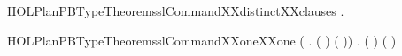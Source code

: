 \newcommand{\HOLPlanPBTypeTheoremspsgCommandXXdistinctXXclauses}{\UseVerbatim{HOLPlanPBTypeTheoremspsgCommandXXdistinctXXclauses}}
\begin{SaveVerbatim}{HOLPlanPBTypeTheoremsslCommandXXdistinctXXclauses}
\HOLTokenTurnstile{} \HOLSymConst{\HOLTokenForall{}} .   \HOLSymConst{\HOLTokenNotEqual{}}  
\end{SaveVerbatim}
\newcommand{\HOLPlanPBTypeTheoremsslCommandXXdistinctXXclauses}{\UseVerbatim{HOLPlanPBTypeTheoremsslCommandXXdistinctXXclauses}}
\begin{SaveVerbatim}{HOLPlanPBTypeTheoremsslCommandXXoneXXone}
\HOLTokenTurnstile{} (\HOLSymConst{\HOLTokenForall{}} . (  \HOLSymConst{=}  ) \HOLSymConst{\HOLTokenEquiv{}} ( \HOLSymConst{=} )) \HOLSymConst{\HOLTokenConj{}}
   \HOLSymConst{\HOLTokenForall{}} . (  \HOLSymConst{=}  ) \HOLSymConst{\HOLTokenEquiv{}} ( \HOLSymConst{=} )
\end{SaveVerbatim}
\newcommand{\HOLPlanPBTypeTheoremsslCommandXXoneXXone}{\UseVerbatim{HOLPlanPBTypeTheoremsslCommandXXoneXXone}}

